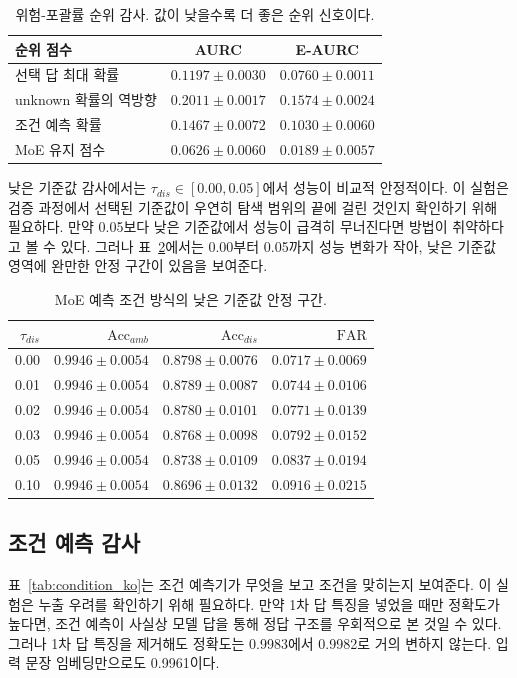 \documentclass{ieeeaccess}
\newcommand{\accamb}{\mathrm{Acc}_{amb}}
\newcommand{\accdis}{\mathrm{Acc}_{dis}}
\newcommand{\far}{\mathrm{FAR}}
\begin{document}
\begin{table}[t]
\caption{위험-포괄률 순위 감사. 값이 낮을수록 더 좋은 순위 신호이다.}
\label{tab:aurc_ko}
\centering
\scriptsize
\begin{tabular}{@{}lcc@{}}
\toprule
순위 점수 & AURC & E-AURC \\
\midrule
선택 답 최대 확률 & $0.1197\pm0.0030$ & $0.0760\pm0.0011$ \\
unknown 확률의 역방향 & $0.2011\pm0.0017$ & $0.1574\pm0.0024$ \\
조건 예측 확률 & $0.1467\pm0.0072$ & $0.1030\pm0.0060$ \\
MoE 유지 점수 & $0.0626\pm0.0060$ & $0.0189\pm0.0057$ \\
\bottomrule
\end{tabular}
\end{table}

낮은 기준값 감사에서는 $\tau_{dis}\in[0.00,0.05]$에서 성능이 비교적 안정적이다. 이 실험은 검증 과정에서 선택된 기준값이 우연히 탐색 범위의 끝에 걸린 것인지 확인하기 위해 필요하다. 만약 0.05보다 낮은 기준값에서 성능이 급격히 무너진다면 방법이 취약하다고 볼 수 있다. 그러나 표~\ref{tab:threshold_ko}에서는 0.00부터 0.05까지 성능 변화가 작아, 낮은 기준값 영역에 완만한 안정 구간이 있음을 보여준다.

\begin{table}[t]
\caption{MoE 예측 조건 방식의 낮은 기준값 안정 구간.}
\label{tab:threshold_ko}
\centering
\scriptsize
\setlength{\tabcolsep}{3.5pt}
\begin{tabular}{@{}rrrr@{}}
\toprule
$\tau_{dis}$ & $\accamb$ & $\accdis$ & $\far$ \\
\midrule
0.00 & $0.9946\pm0.0054$ & $0.8798\pm0.0076$ & $0.0717\pm0.0069$ \\
0.01 & $0.9946\pm0.0054$ & $0.8789\pm0.0087$ & $0.0744\pm0.0106$ \\
0.02 & $0.9946\pm0.0054$ & $0.8780\pm0.0101$ & $0.0771\pm0.0139$ \\
0.03 & $0.9946\pm0.0054$ & $0.8768\pm0.0098$ & $0.0792\pm0.0152$ \\
0.05 & $0.9946\pm0.0054$ & $0.8738\pm0.0109$ & $0.0837\pm0.0194$ \\
0.10 & $0.9946\pm0.0054$ & $0.8696\pm0.0132$ & $0.0916\pm0.0215$ \\
\bottomrule
\end{tabular}
\end{table}

\subsection{조건 예측 감사}
표~\ref{tab:condition_ko}는 조건 예측기가 무엇을 보고 조건을 맞히는지 보여준다. 이 실험은 누출 우려를 확인하기 위해 필요하다. 만약 1차 답 특징을 넣었을 때만 정확도가 높다면, 조건 예측이 사실상 모델 답을 통해 정답 구조를 우회적으로 본 것일 수 있다. 그러나 1차 답 특징을 제거해도 정확도는 0.9983에서 0.9982로 거의 변하지 않는다. 입력 문장 임베딩만으로도 0.9961이다.
\end{document}
